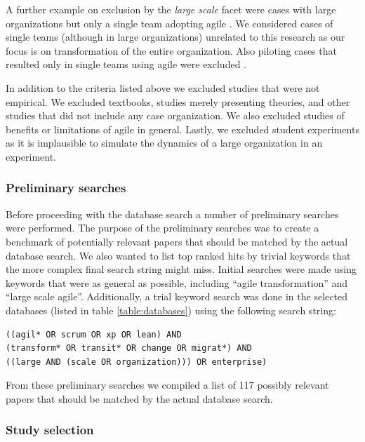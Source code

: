 \documentclass[preprint,authoryear,12pt]{elsarticle}
\begin{document}
A further example on exclusion by the \emph{large scale} facet were cases with
large organizations but only a single team adopting agile \cite{Fulgham2011}.
We considered cases of single teams (although in large organizations) unrelated
to this research as our focus is on transformation of the entire organization.
Also piloting cases that resulted only in single teams using agile were excluded
\cite{Scott2008}.


In addition to the criteria listed above we excluded studies that were not
empirical. We excluded textbooks, studies merely presenting theories, and other
studies that did not include any case organization. We also excluded studies of
benefits or limitations of agile in general. Lastly, we excluded student
experiments as it is implausible to simulate the dynamics of a large
organization in an experiment.


\subsubsection{Preliminary searches}


Before proceeding with the database search a number of preliminary searches were
performed. The purpose of the preliminary searches was to create a benchmark of
potentially relevant papers that should be matched by the actual database
search. We also wanted to list top ranked hits by trivial keywords that the
more complex final search string might miss. Initial searches were made using
keywords that were as general as possible, including ``agile transformation''
and ``large scale agile''. Additionally, a trial keyword search was done in the
selected databases (listed in table \ref{table:databases}) using the following
search string:

\begin{verbatim}
((agil* OR scrum OR xp OR lean) AND
(transform* OR transit* OR change OR migrat*) AND
((large AND (scale OR organization))) OR enterprise)
\end{verbatim}

From these preliminary searches we compiled a list of 117 possibly relevant
papers that should be matched by the actual database search.

\subsubsection{Study selection}
\end{document}
